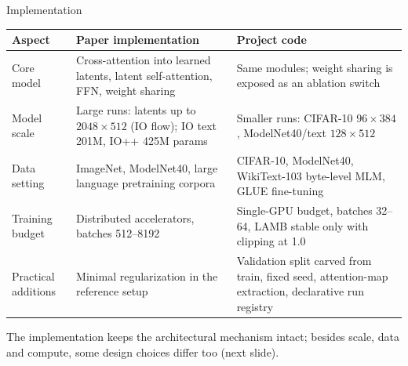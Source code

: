 \documentclass[aspectratio=169,11pt]{beamer}
\begin{document}
\begin{frame}[shrink=5]{Implementation}
  \vspace{0.15em}
  \begin{table}
    \centering\scriptsize
    \begin{tabular}{>{\raggedright\arraybackslash}p{}>{\raggedright\arraybackslash}p{}>{\raggedright\arraybackslash}p{}}
      \toprule
      \textbf{Aspect} & \textbf{Paper implementation} & \textbf{Project code} \\
      \midrule
      Core model &
      Cross-attention into learned latents, latent self-attention, FFN, weight sharing &
      Same modules; weight sharing is exposed as an ablation switch \\
      \midrule
      Model scale &
      Large runs: latents up to $2048{\times}512$ (IO flow); IO text 201M, IO++ 425M params &
      Smaller runs: CIFAR-10 $96{\times}384$, ModelNet40/text $128{\times}512$ \\
      \midrule
      Data setting &
      ImageNet, ModelNet40, large language pretraining corpora &
      CIFAR-10, ModelNet40, WikiText-103 byte-level MLM, GLUE fine-tuning \\
      \midrule
      Training budget &
      Distributed accelerators, batches 512--8192 &
      Single-GPU budget, batches 32--64, LAMB stable only with clipping at 1.0 \\
      \midrule
      Practical additions &
      Minimal regularization in the reference setup &
      Validation split carved from train, fixed seed, attention-map extraction, declarative run registry \\
      \bottomrule
    \end{tabular}
  \end{table}

  \vspace{0.25em}
  {\small The implementation keeps the architectural mechanism intact; besides scale, data and compute, some design choices differ too (next slide).}
\end{frame}
\end{document}
